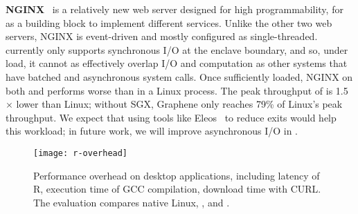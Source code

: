 {\bf NGINX}~\cite{nginx} is a relatively new web server designed for high programmability, for as a building block to implement different services.
Unlike the other two web servers, NGINX is event-driven and mostly configured as single-threaded.
\graphenesgx{} currently only supports synchronous I/O at the enclave boundary,
and so, under load, it cannot as effectively overlap I/O and computation
as other systems that have batched and asynchronous system calls.
Once sufficiently loaded, NGINX on both \graphene{} and \graphenesgx{} 
performs worse than in a  Linux process. %
The peak throughput of \graphenesgx{} is 1.5$\times$ lower than Linux;
without SGX, Graphene only reaches 79\% of Linux's peak throughput.
We expect that using tools like Eleos~\cite{orenbach17eleos} to reduce exits
would help this workload; in future work, we will improve
asynchronous I/O in \graphenesgx{}.



\begin{figure}[t!]
\centering
\footnotesize
\texttt{[image: r-overhead]}\\
\caption{Performance overhead on desktop applications, including latency of R, execution time of GCC compilation, download time with CURL. The evaluation compares native Linux, \graphene{}, and \graphenesgx{}.} %
\label{fig:eval:r-overheads}
\end{figure}


